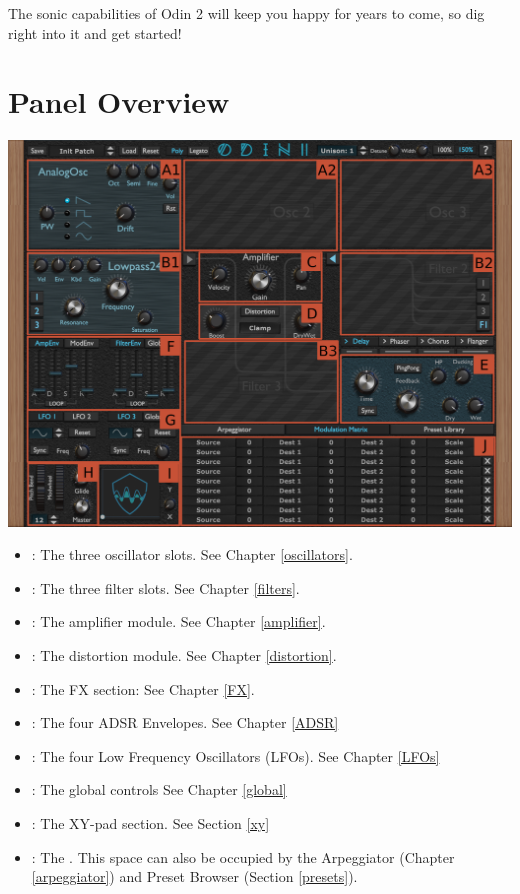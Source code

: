 The sonic capabilities of Odin 2 will keep you happy for years to come, so dig right into it and get started!

\clearpage
\section{Panel Overview}
\begin{center}
    \includegraphics[width=\textwidth]{graphics/overview.png}
\end{center}

\begin{itemize}
    \item {}: The three oscillator slots. See Chapter \ref{oscillators}.
    \item {}: The three filter slots. See Chapter \ref{filters}.
    \item {}: The amplifier module. See Chapter \ref{amplifier}.
    \item {}: The distortion module. See Chapter \ref{distortion}.
    \item {}: The FX section: See Chapter \ref{FX}.
    \item {}: The four ADSR Envelopes. See Chapter \ref{ADSR}
    \item {}: The four Low Frequency Oscillators (LFOs). See Chapter \ref{LFOs}
    \item {}: The global controls See Chapter \ref{global}
    \item {}: The XY-pad section. See Section \ref{xy}
    \item {}: The \modmatrix. This space can also be occupied by the Arpeggiator (Chapter \ref{arpeggiator}) and Preset Browser (Section \ref{presets}).
\end{itemize}
